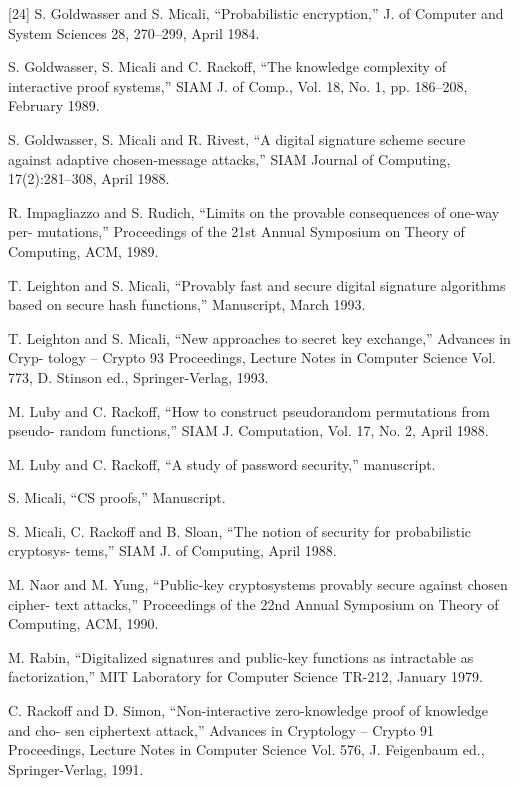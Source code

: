 \documentclass[]{article}
\begin{document}
    [24] S. Goldwasser and S. Micali, “Probabilistic encryption,” J. of Computer and System
    Sciences 28, 270–299, April 1984.\par
    [25] S. Goldwasser, S. Micali and C. Rackoff, “The knowledge complexity of interactive
    proof systems,” SIAM J. of Comp., Vol. 18, No. 1, pp. 186–208, February 1989.\par
    [26] S. Goldwasser, S. Micali and R. Rivest, “A digital signature scheme secure against
    adaptive chosen-message attacks,” SIAM Journal of Computing, 17(2):281–308, April 1988.\par
    [27] R. Impagliazzo and S. Rudich, “Limits on the provable consequences of one-way per-
    mutations,” Proceedings of the 21st Annual Symposium on Theory of Computing, ACM,
    1989.\par
    [28] T. Leighton and S. Micali, “Provably fast and secure digital signature algorithms based
    on secure hash functions,” Manuscript, March 1993.\par
    [29] T. Leighton and S. Micali, “New approaches to secret key exchange,” Advances in Cryp-
    tology – Crypto 93 Proceedings, Lecture Notes in Computer Science Vol. 773, D. Stinson ed.,
    Springer-Verlag, 1993.\par
    [30] M. Luby and C. Rackoff, “How to construct pseudorandom permutations from pseudo-
    random functions,” SIAM J. Computation, Vol. 17, No. 2, April 1988.\par
    [31] M. Luby and C. Rackoff, “A study of password security,” manuscript.\par
    [32] S. Micali, “CS proofs,” Manuscript.\par
    [33] S. Micali, C. Rackoff and B. Sloan, “The notion of security for probabilistic cryptosys-
    tems,” SIAM J. of Computing, April 1988.\par
    [34] M. Naor and M. Yung, “Public-key cryptosystems provably secure against chosen cipher-
    text attacks,” Proceedings of the 22nd Annual Symposium on Theory of Computing, ACM,
    1990.\par
    [35] M. Rabin, “Digitalized signatures and public-key functions as intractable as factorization,”
    MIT Laboratory for Computer Science TR-212, January 1979.\par
    [36] C. Rackoff and D. Simon, “Non-interactive zero-knowledge proof of knowledge and cho-
    sen ciphertext attack,” Advances in Cryptology – Crypto 91 Proceedings, Lecture Notes in
    Computer Science Vol. 576, J. Feigenbaum ed., Springer-Verlag, 1991.\par
\end{document}
